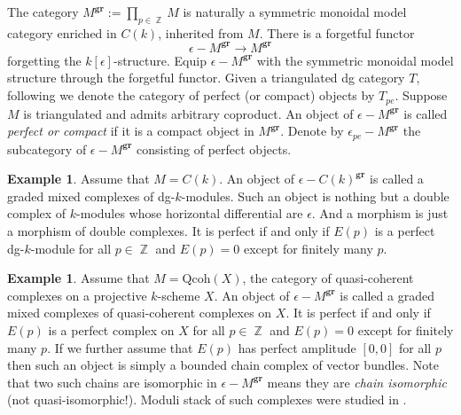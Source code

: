 \documentclass[reqno]{amsart}
\DeclareMathOperator\Z{\mathbb Z}
\theoremstyle{definition}
\newtheorem{example}[theorem]{Example}
\theoremstyle{remark}
\newcommand{\gr}{\mathbf{gr}}
\newcommand{\ep}{\epsilon}
\newcommand{\QC}{\mathrm{Qcoh}}
\numberwithin{equation}{section}
\begin{document}
The category $M^\gr:=\prod_{p\in\Z} M$ is naturally a symmetric monoidal model category enriched in $C(k)$, inherited from $M$. There is a forgetful functor
\[
\ep-M^\gr\to M^\gr
\] forgetting the $k[\ep]$-structure. Equip $\ep-M^\gr$ with the symmetric monoidal model structure through the forgetful functor. Given a triangulated dg category $T$, following \cite{TV07} we denote the category of perfect (or compact) objects by $T_{pe}$. Suppose  $M$ is triangulated and admits arbitrary coproduct. An object of $\ep-M^\gr$ is called \emph{perfect or compact} if it is a compact object in $M^\gr$. Denote by $\ep_{pe}-M^\gr$ the subcategory of $\ep-M^\gr$ consisting of perfect objects.

\begin{example}
Assume that $M=C(k)$. An object of $\ep-C(k)^\gr$ is called a graded mixed complexes of dg-$k$-modules. Such an object is nothing but a double complex of $k$-modules whose horizontal differential are $\ep$. And a morphism is just a morphism of double complexes. It is perfect if and only if $E(p)$ is a perfect dg-$k$-module for all $p\in\Z$ and $E(p)=0$ except for finitely many $p$.
\end{example}

\begin{example}
Assume that $M=\QC(X)$, the category of quasi-coherent complexes on a projective $k$-scheme $X$. An object of $\ep-M^\gr$ is called a graded mixed complexes of quasi-coherent complexes on $X$.   It is perfect if and only if $E(p)$ is a perfect complex on $X$ for all $p\in\Z$ and $E(p)=0$ except for finitely many $p$. If we further assume that $E(p)$ has perfect amplitude $[0,0]$ for all $p$ then such an object is simply a bounded chain complex of vector bundles. Note that two such chains are isomorphic in $\ep-M^\gr$ means they are \emph{chain isomorphic} (not quasi-isomorphic!). Moduli stack of such complexes were studied in \cite{HP1}.
\end{example}
\end{document}
